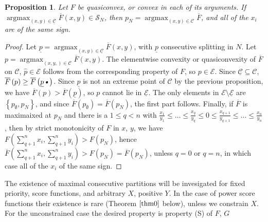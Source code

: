 \documentclass{article}
\newtheorem{prop}{Proposition}
\theoremstyle{case}
\DeclareMathOperator*{\argmax}{argmax} %
\begin{document}
\begin{prop}
Let $F$ be quasiconvex, or convex in each of its arguments. If $\argmax_{\left( x,y\right) \in \underline{\mathcal{C}}} \overline{F}\left( x,y\right) \in \mathcal{S}_N$, then $p_N = \argmax_{\left( x,y\right) \in \mathcal{C}} \overline{F}$, and all of the $x_i$ are of the same sign.
\end{prop}
\begin{proof}
Let $\underline{p} = \argmax_{\left( x,y\right) \in \underline{\mathcal{C}}} \overline{F}\left( x,y\right)$, with $\underline{p}$ consecutive splitting in $N$. Let $p = \argmax_{\left( x,y,\right) \in \mathcal{C}} \overline{F}\left( x,y\right)$. The elementwise convexity or quasiconvexity of $\overline{F}$ on $\mathcal{C}$, $\hat{p} \in \mathcal{E}$ follows from the corresponding property of $F$, so $p \in \mathcal{E}$. Since $\underline{\mathcal{C}} \subseteq \mathcal{C}$, $\overline{F}\left( p\right) \geq \overline{F}\left( \underline{p}\textsl{•}\right)$. Since $\underline{p}$ is not an extreme point of $\mathcal{C}$ by the previous proposition, we have $\overline{F}\left( p\right) > \overline{F}\left( \underline{p}\right)$, so $p$ cannot lie in $\underline{\mathcal{E}}$. The only elements in $\mathcal{E}\setminus \underline{\mathcal{E}}$ are $\left\lbrace p_{\emptyset}, p_{N}\right\rbrace$, and since $\overline{F}\left( p_{\emptyset}\right) = \overline{F}\left( p_N\right)$, the first part follows. Finally, if $\overline{F}$ is maximaixed at $p_N$ and there is a $1 \leq q < n$ with $\frac{x_1}{y_1} \leq \dots \leq \frac{x_q}{y_q} \leq 0 \leq \frac{x_{q+1}}{y_{q+1}} \leq \dots \leq \frac{x_n}{y_n}$, then by strict monotonicity of $F$ in $x$, $y$, we have $F\left( \sum_{q+1}^n x_i, \sum_{q+1}^n y_i\right) > F\left( p_N\right)$, hence $\overline{F}\left( \sum_{q+1}^n x_i, \sum_{q+1}^n y_i\right) > F\left( p_N\right) = \overline{F}\left( p_N\right)$, unless $q = 0$ or $q = n$, in which case all of the $x_i$ of the same sign.
\end{proof}

The existence of maximal consecutive partitions will be invesigated for fixed priority, score functions, and arbitrary $X$, positive $Y$. In the case of power score functions their existence is rare (Theorem $\ref{thm0}$ below), unless we constrain $X$. For the unconstrained case the desired property is property (S) of $F$, $G$
\vspace{8pt}
\end{document}
